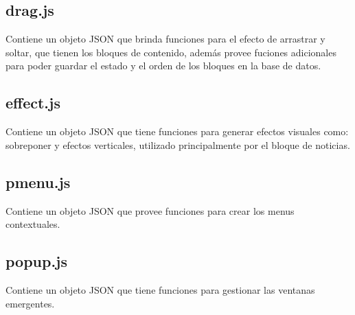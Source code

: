 \subsection{drag.js}
Contiene un objeto JSON que brinda funciones para el efecto de arrastrar y soltar, que tienen los bloques de contenido, adem\'as provee fuciones adicionales para poder guardar el estado y el orden de los bloques en la base de datos.

\subsection{effect.js}
Contiene un objeto JSON que tiene funciones para generar efectos visuales como: sobreponer y efectos verticales, utilizado principalmente por el bloque de noticias.

\subsection{pmenu.js}
Contiene un objeto JSON que provee funciones para crear los menus contextuales.

\subsection{popup.js}
Contiene un objeto JSON que tiene funciones para gestionar las ventanas emergentes.

\clearpage
